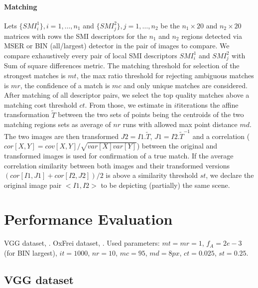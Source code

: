\documentclass[a4paper,11pt]{article}
\begin{document}
\paragraph{Matching}

Lets $\{SMI^1_i\}, i= 1,\ldots, n_1$ and $\{SMI^2_j\}, j= 1,\ldots, n_2$ be the $n_1 \times 20$ and $n_2 \times 20$ matrices with rows the SMI descriptors for the $n_1$ and $n_2$ regions detected via MSER or BIN (all/largest) detector in the pair of images to compare. %
We compare exhaustively every pair of local SMI descriptors $SMI^1_i$ and $SMI^2_j$ with Sum of square differences metric. The matching threshold for selection of the strongest matches is $mt$, the max ratio threshold for rejecting ambiguous matches is $mr$, the confidence of a match is $mc$ and only unique matches are considered.
After matching of all descriptor pairs, we select the top quality matches above a matching cost threshold $ct$. From those, we estimate in $it$iterations the affine transformation ${\tilde T}$ between the two sets of points being the centroids of the two matching regions sets as average of $nr$ runs with allowed max point distance $md$. The two images are then transformed $J2 = I1 . {\tilde T}$, $J1 = I2 . {\tilde T}^{-1}$ and a correlation ($cor[X,Y] = cov[X,Y]/ \sqrt{var[X] var[Y]}$) between the original and transformed images is used for confirmation of a true match. If the average correlation similarity between both images and their transformed versions $(cor[I1, J1]+cor[I2, J2])/2$ is above a similarity threshold $st$, we declare the original image pair $<I1, I2>$ to be depicting (partially) the same scene.

\section{Performance Evaluation}

VGG dataset, \cite{Mikolajczyk:2005}.
OxFrei dataset, \cite{Ranguelova2016AICCSA}.
Used parameters: $mt=mr=1$, $f_A=2e-3$ (for BIN largest), $it=1000$, $nr=10$, $mc=95$, $md=8px$, $ct=0.025$, $st=0.25$.
\subsection{VGG dataset}

\end{document}
